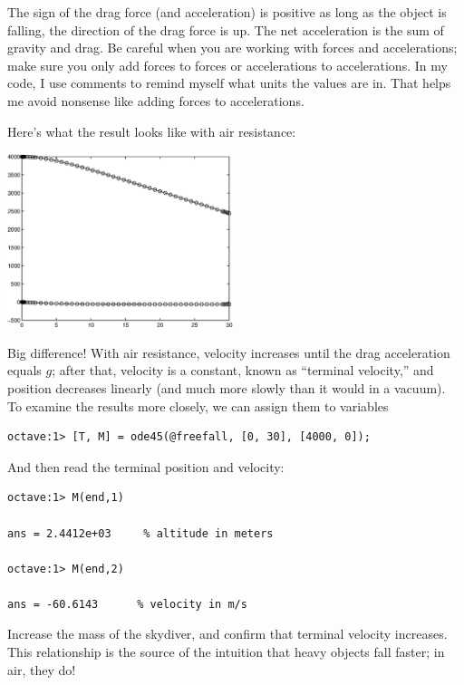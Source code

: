 \documentclass{book}
\begin{document}
The sign of the drag force (and acceleration) is positive as
long as the object is falling, the direction of the drag force is
up.
The net
acceleration is the sum of gravity and drag. Be careful when you
are working with forces and accelerations; make sure you only add
forces to forces or accelerations to accelerations. In my code,
I use comments to remind myself what units the values are in.
That helps me avoid nonsense like adding forces to accelerations.

Here's what the result looks like with air resistance:

\beforefig \centerline{\includegraphics[height=2in]{figs/freefall2.eps}}

Big difference! With air resistance, velocity increases until
the drag acceleration equals $g$; after that, velocity is a constant,
known as ``terminal velocity,'' and position decreases linearly
(and much more slowly than it would in a vacuum). To examine
the results more closely, we can assign them to variables


\begin{verbatim}
octave:1> [T, M] = ode45(@freefall, [0, 30], [4000, 0]);
\end{verbatim}

And then read the terminal position and velocity:

\begin{verbatim}
octave:1> M(end,1)

ans = 2.4412e+03     % altitude in meters

octave:1> M(end,2)

ans = -60.6143      % velocity in m/s
\end{verbatim}

\begin{ex}
Increase the mass of the skydiver, and confirm that
terminal velocity increases. This relationship is the source of the
intuition that heavy objects fall faster; in air, they do!
\end{ex}
\end{document}
